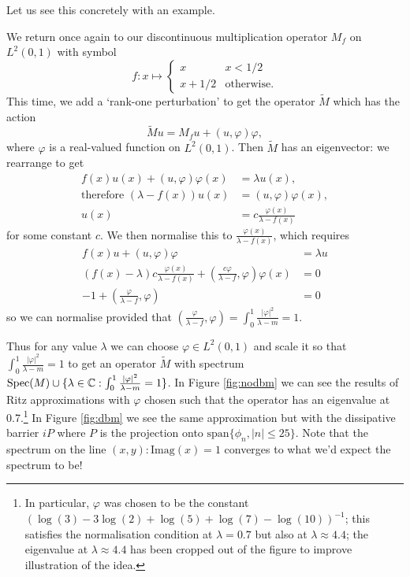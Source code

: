 \documentclass[../main.tex]{subfiles}
\begin{document}
Let us see this concretely with an example.

\begin{example}
We return once again to our discontinuous multiplication operator $M_f$ on $L^2(0, 1)$ with symbol
$$
f: x \mapsto \begin{cases}
x & x < 1/2\\
x+1/2 & \text{otherwise}.
\end{cases}
$$
This time, we add a `rank-one perturbation' to get the operator $\tilde{M}$ which has the action
$$\tilde{M}u = M_fu + (u, \varphi) \varphi,$$
where $\varphi$ is a real-valued function on $L^2(0, 1)$. Then $\tilde{M}$ has an eigenvector: we rearrange to get
\begin{align*}
f(x)u(x) + (u, \varphi)\varphi(x) & = \lambda u(x),\\
\text{therefore }(\lambda - f(x))u(x) & = (u, \varphi)\varphi(x),\\
u(x) & = c \frac{\varphi(x)}{\lambda - f(x)}
\end{align*}
for some constant $c$. We then normalise this to $\frac{\varphi(x)}{\lambda - f(x)}$, which requires
\begin{align*}
f(x)u + (u, \varphi)\varphi & = \lambda u \\
(f(x) - \lambda)c\frac{\varphi(x)}{\lambda - f(x)} + (\frac{c\varphi}{\lambda - f}, \varphi)\varphi(x) & = 0 \\
-1 + (\frac{\varphi}{\lambda - f}, \varphi) & = 0
\end{align*}
so we can normalise provided that $(\frac{\varphi}{\lambda - f}, \varphi) = \int_0^1 \frac{|\varphi|^2}{\lambda - m} = 1.$
\end{example}

Thus for any value $\lambda$ we can choose $\varphi \in L^2(0, 1)$ and scale it so that $\int_0^1 \frac{|\varphi|^2}{\lambda - m} = 1$
to get an operator $\tilde{M}$ with spectrum $\mathrm{Spec}(M) \cup \{\lambda \in \mathbb{C} : \int_0^1 \frac{|\varphi|^2}{\lambda - m} = 1\}$. In Figure \ref{fig:nodbm} we can see the results of Ritz approximations
with $\varphi$ chosen such that the operator has an eigenvalue at 0.7.\footnote{In particular, $\varphi$ was chosen to be the constant
$(\log(3) - 3\log(2) + \log(5) + \log(7) - \log(10))^{-1}$; this satisfies the normalisation condition at $\lambda = 0.7$ but also at $\lambda \approx 4.4$;
the eigenvalue at $\lambda \approx 4.4$ has been cropped out of the figure to improve illustration of the idea.} In Figure \ref{fig:dbm} we see the same approximation but with the dissipative barrier $iP$ where $P$ is the projection onto $\mathrm{span}\{\phi_n, |n| \leq 25\}$. Note that the spectrum on the line ${(x, y) : \mathrm{Imag}(x) = 1}$ converges to what we'd expect the spectrum to be!
\end{document}
